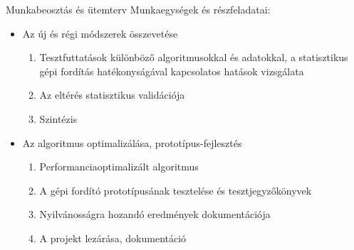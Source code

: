 \begin{frame}{Munkabeosztás és ütemterv}
Munkaegységek és részfeladatai:
\begin{itemize}
  \item<1-> {
    Az új és régi módszerek összevetése
    \begin{enumerate}
        \item Tesztfuttatások különböző algoritmusokkal és adatokkal, a statisztikus gépi fordítás hatékonyságával kapcsolatos hatások vizsgálata
        \item Az eltérés statisztikus validációja
        \item Szintézis
    \end{enumerate}
  }
  \item<2-> {
    Az algoritmus optimalizálása, prototípus-fejlesztés
    \begin{enumerate}
        \item Performanciaoptimalizált algoritmus
        \item A gépi fordító prototípusának tesztelése és tesztjegyzőkönyvek
        \item Nyilvánosságra hozandó eredmények dokumentációja
        \item A projekt lezárása, dokumentáció
    \end{enumerate}
  }
  \end{itemize}
\end{frame}

